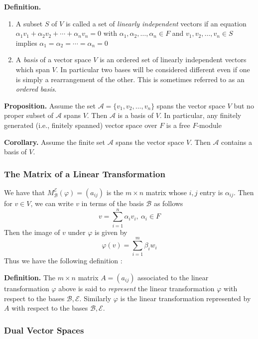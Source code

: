 \documentclass[11pt, reqno]{amsart}
\theoremstyle{plain}
\theoremstyle{definition}
\theoremstyle{example}
\begin{document}
\par
\textbf{Definition.} \begin{enumerate}
\item A subset $S$ of $V$ is called a set of \textit{linearly independent} vectors if an equation $\alpha_1 v_1 + \alpha_2 v_2 + \cdots + \alpha_n v_n = 0$ with $\alpha_1, \alpha_2, \ldots, \alpha_n \in F$ and $v_1, v_2, \ldots, v_n \in S$ implies $\alpha_1 = \alpha_2 = \cdots = \alpha_n = 0$
\item A \textit{basis} of a vector space $V$ is an ordered set of linearly independent vectors which span $V$. In particular two bases will be considered different even if one is simply a rearrangement of the other. This is sometimes referred to as an \textit{ordered basis}.
\end{enumerate}

\textbf{Proposition.} Assume the set $\mathcal{A} = \{v_1, v_2, \ldots, v_n\}$ spans the vector space $V$ but no proper subset of $\mathcal{A}$ spans $V$. Then $\mathcal{A}$ is a basis of $V$. In particular, any finitely generated (i.e., finitely spanned) vector space over $F$ is a free $F$-module

\par
\textbf{Corollary.} Assume the finite set $\mathcal{A}$ spans the vector space $V$. Then $\mathcal{A}$ contains a basis of $V$.

\subsubsection{The Matrix of a Linear Transformation}

We have that $M_{\mathcal{B}}^{\mathcal{E}}(\varphi) = (a_{ij})$ is the $m \times n$ matrix whose $i, j$ entry is $\alpha_{ij}$. Then for $v \in V$, we can write $v$ in terms of the basis $\mathcal{B}$ as follows $$v = \sum_{i=1}^n \alpha_i v_i, \ \alpha_i \in F$$Then the image of $v$ under $\varphi$ is given by $$\varphi(v) = \sum_{i=1}^m \beta_i w_i$$Thus we have the following definition \cite[\S 11.2, p. 415]{dummit}:

\par
\textbf{Definition.} The $m \times n$ matrix $A = (a_{ij})$ associated to the linear transformation $\varphi$ above is said to \textit{represent} the linear transformation $\varphi$ with respect to the bases $\mathcal{B}, \mathcal{E}$. Similarly $\varphi$ is the linear transformation represented by $A$ with respect to the bases $\mathcal{B}, \mathcal{E}$.


\subsubsection{Dual Vector Spaces}
\end{document}
